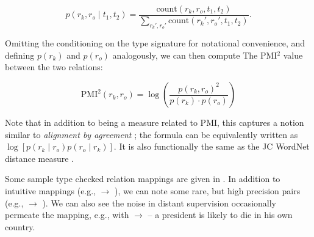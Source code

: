\vspace{0.25cm}
\begin{equation*}
  p(r_k, r_o \mid t_1, t_2) = \frac{
    \textrm{count}(r_k, r_o,  t_1, t_2)
  }{
    \sum_{r_k', r_o'}\textrm{count}(r_k', r_o', t_1, t_2)
  }.
\end{equation*}
\vspace{0.25cm}

Omitting the conditioning on the type signature for notational convenience,
  and defining $p(r_k)$ and $p(r_o)$ analogously,
  we can then compute The PMI$^2$ value between the two relations:

\vspace{0.25cm}
\begin{equation*}
  \textrm{PMI}^2(r_k, r_o) = \log \left( \frac{p(r_k, r_o)^2}{p(r_k) \cdot p(r_o)} \right)
\end{equation*}
\vspace{0.25cm}

Note that in addition to being a measure related to PMI, this captures
  a notion similar to \textit{alignment by agreement} 
  \cite{key:2006liang-alignment};
  the formula can be equivalently written as 
  $\log \left[ p(r_k \mid r_o) p(r_o \mid r_k)\right]$.
It is also functionally the same as the JC WordNet distance measure
  \cite{key:1997jc-similarity}.

Some sample type checked relation mappings are given in .
In addition to intuitive mappings (e.g.,  $\rightarrow$ 
  ), we can note some rare, but high precision pairs
  (e.g.,  $\rightarrow$ ).
We can also see the noise in distant supervision occasionally permeate 
  the mapping, e.g., with  $\rightarrow$ 
  -- a president is likely to die in his own country.


  


